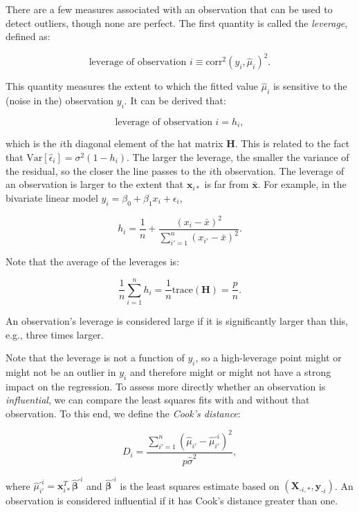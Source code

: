 \documentclass[
  11pt,
  letterpaper,
  oneside]{book}
\theoremstyle{definition}
\theoremstyle{plain}
\theoremstyle{plain}
\theoremstyle{plain}
\theoremstyle{remark}
\begin{document}
There are a few measures associated with an observation that can be used
to detect outliers, though none are perfect. The first quantity is
called the \emph{leverage}, defined as:

\[
\text{leverage of observation } i \equiv \text{corr}^2(y_i, \widehat{\mu}_i)^2.
\]

This quantity measures the extent to which the fitted value
\(\widehat{\mu}_i\) is sensitive to the (noise in the) observation
\(y_i\). It can be derived that:

\[
\text{leverage of observation } i = h_i,
\]

which is the \(i\)th diagonal element of the hat matrix
\(\boldsymbol{H}\). This is related to the fact that
\(\text{Var}[\widehat{\epsilon}_i] = \sigma^2(1-h_i)\). The larger the
leverage, the smaller the variance of the residual, so the closer the
line passes to the \(i\)th observation. The leverage of an observation
is larger to the extent that \(\boldsymbol{x}_{i*}\) is far from
\(\boldsymbol{\bar{x}}\). For example, in the bivariate linear model
\(y_i = \beta_0 + \beta_1 x_i + \epsilon_i\),

\[
h_i = \frac{1}{n} + \frac{(x_i - \bar{x})^2}{\sum_{i' = 1}^n (x_{i'} - \bar{x})^2}.
\]

Note that the average of the leverages is:

\[
\frac{1}{n}\sum_{i = 1}^n h_i = \frac{1}{n}\text{trace}(\boldsymbol{H}) = \frac{p}{n}.
\]

An observation's leverage is considered large if it is significantly
larger than this, e.g., three times larger.

Note that the leverage is not a function of \(y_i\), so a high-leverage
point might or might not be an outlier in \(y_i\) and therefore might or
might not have a strong impact on the regression. To assess more
directly whether an observation is \emph{influential}, we can compare
the least squares fits with and without that observation. To this end,
we define the \emph{Cook's distance}:

\[
D_i = \frac{\sum_{i' = 1}^n (\widehat{\mu}_{i'} - \widehat{\mu}^{\text{-}i}_{i'})^2}{p\widehat{\sigma}^2},
\]

where
\(\widehat{\mu}^{\text{-}i}_{i'} = \boldsymbol{x}_{i*}^T \boldsymbol{\widehat{\beta}}^{\text{-}i}\)
and \(\boldsymbol{\widehat{\beta}}^{\text{-}i}\) is the least squares
estimate based on
\((\boldsymbol{X}_{\text{-}i,*}, \boldsymbol{y}_{\text{-}i})\). An
observation is considered influential if it has Cook's distance greater
than one.
\end{document}
